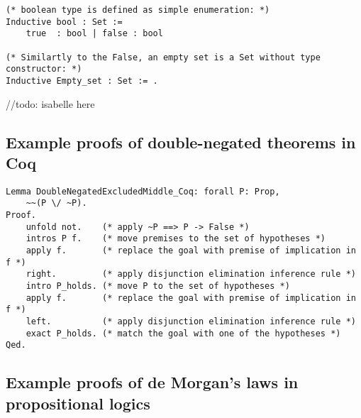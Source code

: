 \documentclass[article]{aaltoseries}
\begin{document}
\begin{lstlisting}[language=coq, 
  caption={Basic \texttt{Set} types definitions in Coq},
  label={ex_typedef_bool_coq}]
(* boolean type is defined as simple enumeration: *)
Inductive bool : Set :=
    true  : bool | false : bool

(* Similartly to the False, an empty set is a Set without type constructor: *)
Inductive Empty_set : Set := .
\end{lstlisting}


//todo: isabelle here

\subsection{Example proofs of double-negated theorems in Coq}
\label{apx:double_negated}


\begin{lstlisting}[language=coq,
    caption={Proof of the double-negated excluded middle in Coq},
    label={ex_double_neg_ex_mid_coq}]
Lemma DoubleNegatedExcludedMiddle_Coq: forall P: Prop,
    ~~(P \/ ~P).
Proof.
    unfold not.    (* apply ~P ==> P -> False *)
    intros P f.    (* move premises to the set of hypotheses *)
    apply f.       (* replace the goal with premise of implication in f *)
    right.         (* apply disjunction elimination inference rule *)
    intro P_holds. (* move P to the set of hypotheses *)
    apply f.       (* replace the goal with premise of implication in f *)
    left.          (* apply disjunction elimination inference rule *)
    exact P_holds. (* match the goal with one of the hypotheses *)
Qed.
\end{lstlisting}


\subsection{Example proofs of de Morgan's laws in propositional logics}
\label{apx:morgan_propos}
\end{document}
